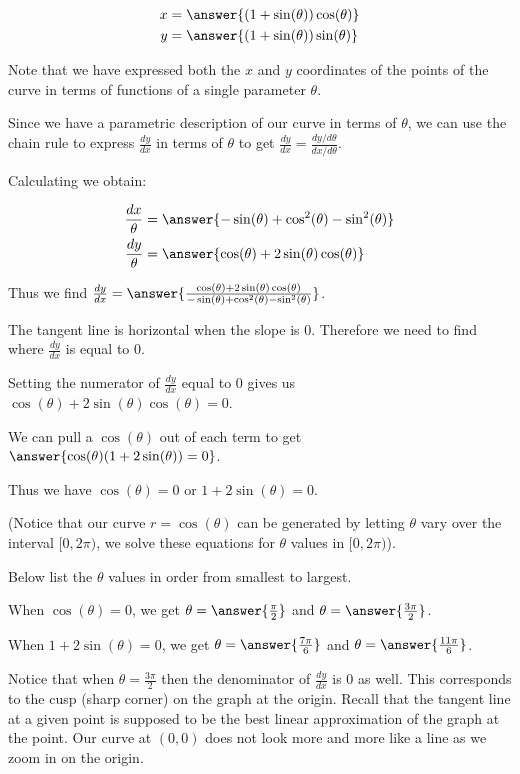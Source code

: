 \documentclass{ximera}
\begin{document}
\begin{exercise}
\begin{hint}
\begin{align*}
x&=\answer{(1+\sin(\theta))\cos(\theta)} \\
y&=\answer{(1+\sin(\theta))\sin(\theta) }
\end{align*}

Note that we have expressed both the $x$ and $y$ coordinates of the points of the curve in terms of functions of a single parameter $\theta$.

Since we have a parametric description of our curve in terms of $\theta$, 
we can use the chain rule to express $\frac{dy}{dx}$ in terms of $\theta$ to get $\frac{dy}{dx}=\frac{ dy/d\theta}{dx/d\theta}$.

Calculating we obtain:

\begin{align*}
\frac{dx}{\theta}&=\answer{ -\sin(\theta)+\cos^2(\theta)-\sin^2(\theta)  } \\
\frac{dy}{\theta}&=\answer{ \cos(\theta) + 2\sin(\theta)\cos(\theta)   }
\end{align*} 

Thus we find $\frac{dy}{dx}=\answer{\frac{ \cos(\theta) + 2\sin(\theta)\cos(\theta) }{-\sin(\theta)+\cos^2(\theta)-\sin^2(\theta) }}$. 

The tangent line is horizontal when the slope is $0$. Therefore we need to find where $\frac{dy}{dx}$ is equal to $0$.

Setting the numerator of $\frac{dy}{dx}$ equal to $0$ gives us $\cos(\theta) + 2\sin(\theta)\cos(\theta)=0$. 

We can pull a $\cos(\theta)$ out of each term to get $\answer{\cos(\theta)(1+2\sin(\theta))=0 }$. 

Thus we have $\cos(\theta)=0$ or $1+2\sin(\theta)=0$. 


(Notice that our curve $r=\cos(\theta)$ can be generated by letting $\theta$ vary over the interval $[0, 2\pi)$, we solve these equations for $\theta$ values in  $[0, 2\pi)$).

Below list the $\theta$ values in order from smallest to largest.  

When $\cos(\theta)=0$, we get $\theta=\answer{\frac{\pi}{2}}$ and $\theta=\answer{\frac{3\pi}{2}}$.  

When $1+2\sin(\theta)=0$, we get $\theta=\answer{ \frac{7\pi}{6}}$ and $\theta=\answer{\frac{11\pi}{6}}$.

Notice that when $\theta=\frac{3\pi}{2}$ then the denominator of $\frac{dy}{dx}$ is $0$ as well. This corresponds to the cusp (sharp corner) on the graph at the origin. Recall that the tangent line at a given point is supposed to be the best linear approximation of the graph at the point. Our curve at $(0,0)$ does not look more and more like a line as we zoom in on the origin. 


\end{hint}
\end{exercise}
\end{document}
